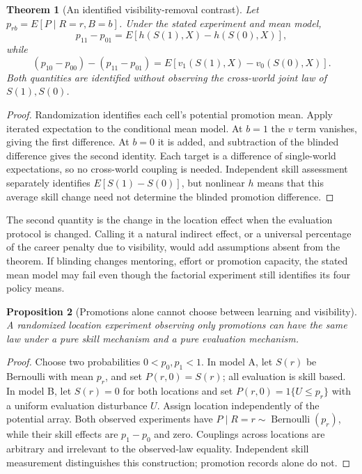 \documentclass[11pt]{article}
\newtheorem{theorem}{Theorem}
\newtheorem{proposition}[theorem]{Proposition}
\theoremstyle{remark}
\begin{document}
\begin{theorem}[An identified visibility-removal contrast]
Let $p_{rb}=E[P\mid R=r,B=b]$. Under the stated experiment and mean model,
\[
 p_{11}-p_{01}=E[h(S(1),X)-h(S(0),X)],
\]
while
\[
 (p_{10}-p_{00})-(p_{11}-p_{01})
 =E[v_1(S(1),X)-v_0(S(0),X)].
\]
Both quantities are identified without observing the cross-world joint law of $S(1),S(0)$.
\end{theorem}
\begin{proof}
Randomization identifies each cell's potential promotion mean. Apply iterated expectation to the conditional mean model. At $b=1$ the $v$ term vanishes, giving the first difference. At $b=0$ it is added, and subtraction of the blinded difference gives the second identity. Each target is a difference of single-world expectations, so no cross-world coupling is needed. Independent skill assessment separately identifies $E[S(1)-S(0)]$, but nonlinear $h$ means that this average skill change need not determine the blinded promotion difference.
\end{proof}
The second quantity is the change in the location effect when the evaluation protocol is changed. Calling it a natural indirect effect, or a universal percentage of the career penalty due to visibility, would add assumptions absent from the theorem. If blinding changes mentoring, effort or promotion capacity, the stated mean model may fail even though the factorial experiment still identifies its four policy means.

\begin{proposition}[Promotions alone cannot choose between learning and visibility]
A randomized location experiment observing only promotions can have the same law under a pure skill mechanism and a pure evaluation mechanism.
\end{proposition}
\begin{proof}
Choose two probabilities $0<p_0,p_1<1$. In model A, let $S(r)$ be Bernoulli with mean $p_r$, and set $P(r,0)=S(r)$; all evaluation is skill based. In model B, let $S(r)=0$ for both locations and set $P(r,0)=1\{U\le p_r\}$ with a uniform evaluation disturbance $U$. Assign location independently of the potential array. Both observed experiments have $P\mid R=r\sim\operatorname{Bernoulli}(p_r)$, while their skill effects are $p_1-p_0$ and zero. Couplings across locations are arbitrary and irrelevant to the observed-law equality. Independent skill measurement distinguishes this construction; promotion records alone do not.
\end{proof}
\end{document}
